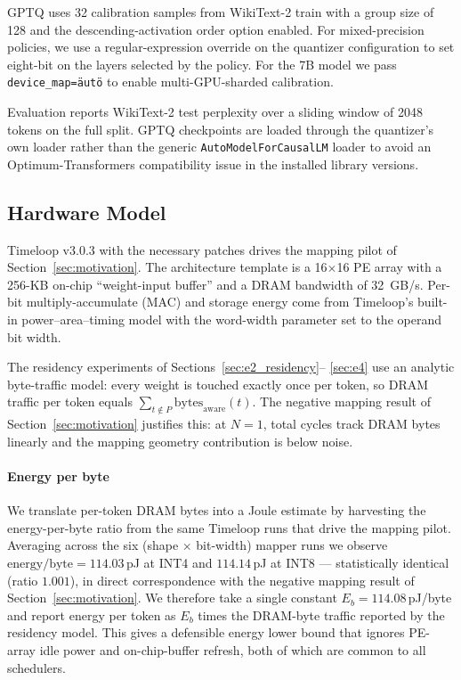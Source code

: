 \documentclass{ieeeaccess}
\begin{document}
GPTQ uses 32 calibration samples from WikiText-2 train with a group
size of 128 and the descending-activation order option enabled. For
mixed-precision policies, we use a regular-expression override on the
quantizer configuration to set eight-bit on the layers selected by the
policy. For the 7B model we pass \texttt{device\_map=\"auto\"} to enable
multi-GPU-sharded calibration.

Evaluation reports WikiText-2 test perplexity over a sliding window of
2048 tokens on the full split. GPTQ checkpoints are loaded through the
quantizer's own loader rather than the generic
\texttt{AutoModelForCausalLM} loader to avoid an Optimum-Transformers
compatibility issue in the installed library versions.

\subsection{Hardware Model}
Timeloop v3.0.3 with the necessary patches drives the mapping pilot of
Section~\ref{sec:motivation}. The architecture template is a
16$\times$16 PE array with a 256-KB on-chip ``weight-input buffer'' and
a DRAM bandwidth of 32~GB/s. Per-bit multiply-accumulate (MAC) and
storage energy come from Timeloop's built-in power--area--timing model
with the word-width parameter set to the operand bit width.

The residency experiments of Sections~\ref{sec:e2_residency}--%
\ref{sec:e4} use an analytic byte-traffic model: every weight is
touched exactly once per token, so DRAM traffic per token equals
$\sum_{t \notin P} \mathrm{bytes}_{\mathrm{aware}}(t)$. The negative
mapping result of Section~\ref{sec:motivation} justifies this: at
$N\!=\!1$, total cycles track DRAM bytes linearly and the mapping
geometry contribution is below noise.

\paragraph{Energy per byte}
We translate per-token DRAM bytes into a Joule estimate by harvesting
the energy-per-byte ratio from the same Timeloop runs that drive the
mapping pilot. Averaging across the six (shape $\times$ bit-width)
mapper runs we observe $\mathrm{energy/byte}\!=\!114.03$\,pJ at INT4 and
$114.14$\,pJ at INT8 --- statistically identical (ratio $1.001$), in
direct correspondence with the negative mapping result of
Section~\ref{sec:motivation}. We therefore take a single constant
$E_b\!=\!114.08$\,pJ/byte and report energy per token as $E_b$ times
the DRAM-byte traffic reported by the residency model. This gives a
defensible energy lower bound that ignores PE-array idle power and
on-chip-buffer refresh, both of which are common to all schedulers.
\end{document}

